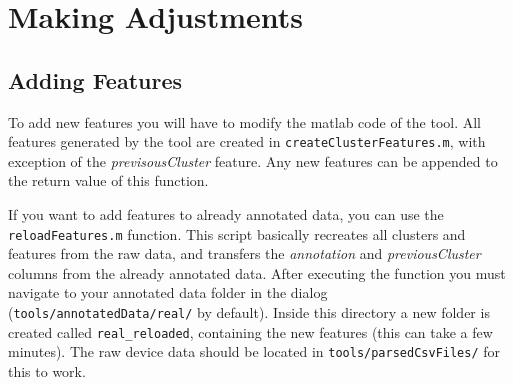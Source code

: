 \documentclass[a4paper, 11pt]{article}
\begin{document}
\section{Making Adjustments}

\subsection{Adding Features}

To add new features you will have to modify the matlab code of the tool. All features generated by the tool are created in \verb|createClusterFeatures.m|, with exception of the \emph{previsousCluster} feature. Any new features can be appended to the return value of this function. 

If you want to add features to already annotated data, you can use the \verb|reloadFeatures.m| function. This script basically recreates all clusters and features from the raw data, and transfers the \emph{annotation} and \emph{previousCluster} columns from the already annotated data. After executing the function you must navigate to your annotated data folder in the dialog (\verb|tools/annotatedData/real/| by default). Inside this directory a new folder is created called \verb|real_reloaded|, containing the new features (this can take a few minutes). The raw device data should be located in \verb|tools/parsedCsvFiles/| for this to work.
\end{document}
